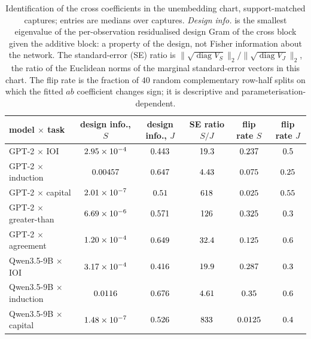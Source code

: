 \begin{table}[!htbp]
\centering\small
\begin{tabular}{lccccc}
\toprule
model $\times$ task & design info., $S$ & design info., $J$ & SE ratio $S/J$ & flip rate $S$ & flip rate $J$ \\
\midrule
GPT-2 $\times$ IOI          & $2.95\times10^{-4}$  & $0.443$  & $19.3$  & $0.237$  & $0.5$ \\
GPT-2 $\times$ induction    & $0.00457$  & $0.647$  & $4.43$  & $0.075$  & $0.25$ \\
GPT-2 $\times$ capital      & $2.01\times10^{-7}$  & $0.51$  & $618$  & $0.025$  & $0.55$ \\
GPT-2 $\times$ greater-than & $6.69\times10^{-6}$   & $0.571$   & $126$   & $0.325$   & $0.3$ \\
GPT-2 $\times$ agreement    & $1.20\times10^{-4}$  & $0.649$  & $32.4$  & $0.125$  & $0.6$ \\
Qwen3.5-9B $\times$ IOI     & $3.17\times10^{-4}$ & $0.416$ & $19.9$ & $0.287$ & $0.3$ \\
Qwen3.5-9B $\times$ induction & $0.0116$ & $0.676$ & $4.61$ & $0.35$ & $0.6$ \\
Qwen3.5-9B $\times$ capital & $1.48\times10^{-7}$ & $0.526$ & $833$ & $0.0125$ & $0.4$ \\
\bottomrule
\end{tabular}
\caption{Identification of the cross coefficients in the unembedding chart, support-matched captures; entries are
medians over captures. \emph{Design info.} is the smallest eigenvalue of the per-observation residualised design Gram
of the cross block given the additive block: a property of the design, not Fisher information about the network.
The standard-error (SE) ratio is $\|\sqrt{\operatorname{diag}V_S}\|_2/\|\sqrt{\operatorname{diag}V_J}\|_2$,
the ratio of the Euclidean norms of the marginal standard-error vectors in this chart. The flip rate
is the fraction of $40$ random complementary row-half splits on which the fitted $ab$ coefficient changes sign; it is
descriptive and parameterisation-dependent.}
\label{tab:ident}
\end{table}

\clearpage
